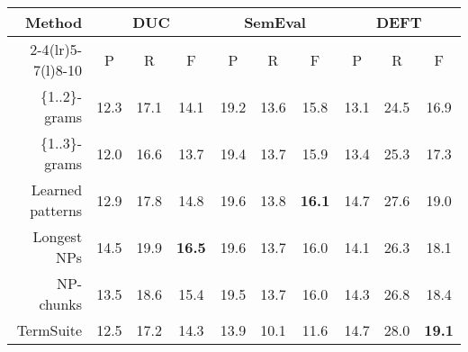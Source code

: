       \begin{table*}
        \centering
        \begin{tabular}{@{~}rccccccccc@{~}}
          \toprule
          \multirow{2}{*}[-2pt]{\textbf{Method}} & \multicolumn{3}{c}{\textbf{DUC}} & \multicolumn{3}{c}{\textbf{SemEval}} & \multicolumn{3}{c}{\textbf{DEFT}}\\
          \cmidrule(r){2-4}\cmidrule(lr){5-7}\cmidrule(l){8-10}
          & P & R & F & P & R & F & P & R & F\\
          \midrule
          \{1..2\}-grams & 12.3 & 17.1 & 14.1 & 19.2 & 13.6 & 15.8 & 13.1 & 24.5 & 16.9\\
          \{1..3\}-grams & 12.0 & 16.6 & 13.7 & 19.4 & 13.7 & 15.9 & 13.4 & 25.3 & 17.3\\
          Learned patterns & 12.9 & 17.8 & 14.8 & 19.6 & 13.8 & \textbf{16.1} & 14.7 & 27.6 & 19.0\\
          Longest NPs & 14.5 & 19.9 & \textbf{16.5} & 19.6 & 13.7 & 16.0 & 14.1 & 26.3 & 18.1\\
          NP-chunks & 13.5 & 18.6 & 15.4 & 19.5 & 13.7 & 16.0 & 14.3 & 26.8 & 18.4\\
          TermSuite & 12.5 & 17.2 & 14.3 & 13.9 & 10.1 & 11.6 & 14.7 & 28.0 & \textbf{19.1}\\
          \bottomrule
        \end{tabular}
        \caption{Comparison of candidate extraction methods, when extracting 10
                 keyphrases with \textbf{KEA}.
                 \label{tab:kea_results}}
      \end{table*}
